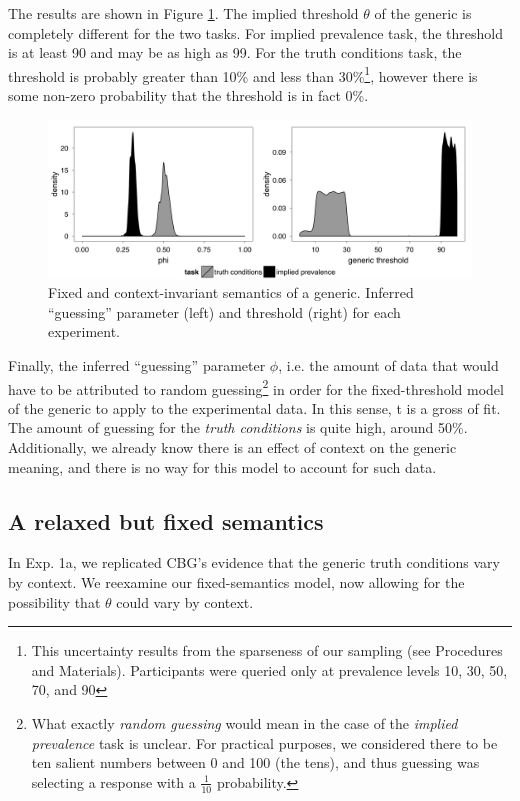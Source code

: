 \documentclass[10pt,letterpaper]{article}
\begin{document}
The results are shown in Figure \ref{fig:trulyfixed}. The implied threshold $\theta$ of the generic is completely different for the two tasks. For implied prevalence task, the threshold is at least 90 and may be as high as 99. For the truth conditions task, the threshold is probably greater than 10\% and less than 30\%\footnote{This uncertainty results from the sparseness of our sampling (see Procedures and Materials). Participants were queried only at prevalence levels 10, 30, 50, 70, and 90}, however there is some non-zero probability that the threshold is in fact 0\%. 

\begin{figure}
\centering
    \includegraphics[width=\columnwidth]{trulyFixed_phis_thetas}
    \caption{Fixed and context-invariant semantics of a generic. Inferred ``guessing'' parameter (left) and threshold (right) for each experiment.}
  \label{fig:trulyfixed}
\end{figure}

Finally, the inferred ``guessing'' parameter $\phi$, i.e. the amount of data that would have to be attributed to random guessing\footnote{What exactly \emph{random guessing} would mean in the case of the \emph{implied prevalence} task is unclear. For practical purposes, we considered there to be ten salient numbers between 0 and 100 (the tens), and thus guessing was selecting a response with a $\frac{1}{10}$ probability.} in order for the fixed-threshold model of the generic  to apply to the experimental data. In this sense, t is a gross of fit. The amount of guessing for the \emph{truth conditions} is quite high, around 50\%. Additionally, we already know there is an effect of context on the generic meaning, and there is no way for this model to account for such data.

\subsection{A relaxed but fixed semantics}

In Exp. 1a, we replicated CBG's evidence that the generic truth conditions vary by context. We reexamine our fixed-semantics model, now allowing for the possibility that $\theta$ could vary by context.
\end{document}
